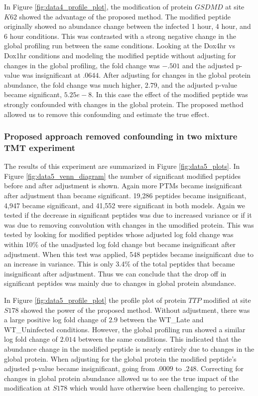 \documentclass[mcp]{article}
\numberwithin{table}{section}
\begin{document}
In Figure \ref{fig:data4_profile_plot}, the modification of protein $GSDMD$ at site $K62$ showed the advantage of the proposed method. The modified peptide originally showed no abundance change between the infected 1 hour, 4 hour, and 6 hour conditions. This was contrasted with a strong negative change in the global profiling run between the same conditions. Looking at the Dox4hr vs Dox1hr conditions and modeling the modified peptide without adjusting for changes in the global profiling, the fold change was $-.501$ and the adjusted p-value was insignificant at $.0644$. After adjusting for changes in the global protein abundance, the fold change was much higher, $2.79$, and the adjusted p-value became significant, $5.25e-8$. In this case the effect of the modified peptide was strongly confounded with changes in the global protein. The proposed method allowed us to remove this confounding and estimate the true effect.

\subsubsection*{Proposed approach removed confounding in two mixture TMT experiment}

The results of this experiment are summarized in Figure \ref{fig:data5_plots}. In Figure \ref{fig:data5_venn_diagram} the number of significant modified peptides before and after adjustment is shown. Again more PTMs became insignificant after adjustment than became significant. 19,286 peptides became insignificant, 4,947 became significant, and 41,552 were significant in both models. Again we tested if the decrease in significant peptides was due to increased variance or if it was due to removing convolution with changes in the umodified protein. This was tested by looking for modified peptides whose adjusted log fold change was within 10\% of the unadjusted log fold change but became insignificant after adjustment. When this test was applied, 548 peptides became insignificant due to an increase in variance. This is only 3.4\% of the total peptides that became insignificant after adjustment. Thus we can conclude that the drop off in significant peptides was mainly due to changes in global protein abundance.

In Figure \ref{fig:data5_profile_plot} the profile plot of protein $TTP$ modified at site $S178$ showed the power of the proposed method. Without adjustment, there was a large positive log fold change of $2.9$ between the WT\_Late and WT\_Uninfected conditions. However, the global profiling run showed a similar log fold change of $2.014$ between the same conditions. This indicated that the abundance change in the modified peptide is nearly entirely due to changes in the global protein. When adjusting for the global protein the modified peptide's adjusted p-value became insignificant, going from $.0009$ to $.248$. Correcting for changes in global protein abundance allowed us to see the true impact of the modification at $S178$ which would have otherwise been challenging to perceive.
\end{document}
